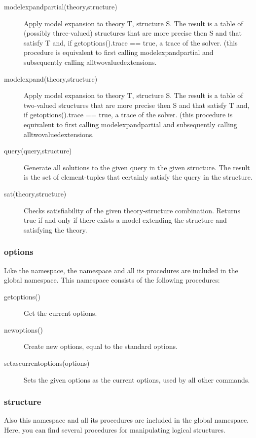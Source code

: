 \begin{description}
	\item[modelexpandpartial(theory,structure)]
		Apply model expansion to theory T, structure S.
 		The result is a table of (possibly three-valued) structures that are more precise then S and that satisfy T  and, if getoptions().trace == true, a trace of the solver.
		(this procedure is equivalent to first calling modelexpandpartial and subsequently calling alltwovaluedextensions. 
	\item[modelexpand(theory,structure)]
 		Apply model expansion to theory T, structure S.
 		The result is a table of two-valued structures that are more precise then S and that satisfy T and, if getoptions().trace == true, a trace of the solver.
		(this procedure is equivalent to first calling modelexpandpartial and subsequently calling alltwovaluedextensions. 
		
	\item[query(query,structure)]
 		Generate all solutions to the given query in the given structure. The result is the set of element-tuples that certainly satisfy the query in the structure.
	\item[sat(theory,structure)]
		Checks satisfiability of the given theory-structure combination. Returns true if and only if there exists a model extending the structure and satisfying the theory.
		
\end{description}


\subsubsection{options}
Like the  namespace, the  namespace and all its procedures are included in the global namespace. This namespace consists of the following procedures:

\begin{description}
	\item[getoptions()]
 		Get the current options.
	\item[newoptions()]
 		Create new options, equal to the standard options.
	\item[setascurrentoptions(options)]
 		Sets the given options as the current options, used by all other commands.
\end{description}

\subsubsection{structure}
Also this  namespace and all its procedures are included in the global namespace. Here, you can find several procedures for manipulating logical structures.

